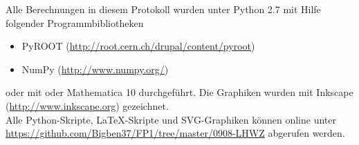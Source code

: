 \documentclass[12pt, a4paper]{scrartcl}
\title{\exptitle}
\subtitle{Fortgeschrittenen-Praktikum 1}
\author{Moritz Bitterling und Benjamin Rottler \\ Universität Freiburg}
\date{\expdate}
\numberwithin{equation}{section} %
\numberwithin{table}{section}    %
\begin{document}
\hypersetup{pageanchor=false} %

\thispagestyle{empty}

\newpage
Alle Berechnungen in diesem Protokoll wurden unter Python 2.7 mit Hilfe folgender Programmbibliotheken
\begin{itemize}
  \item PyROOT (\url{http://root.cern.ch/drupal/content/pyroot})
  \item NumPy (\url{http://www.numpy.org/})
\end{itemize}
oder mit oder Mathematica 10 durchgeführt.
Die Graphiken wurden mit Inkscape (\url{http://www.inkscape.org}) gezeichnet.\\[\baselineskip]
Alle Python-Skripte, \LaTeX-Skripte und SVG-Graphiken können online unter \\
\url{https://github.com/Bigben37/FP1/tree/master/0908-LHWZ} abgerufen werden.
\thispagestyle{empty}

\newpage
\tableofcontents
\thispagestyle{empty}

\newpage
\hypersetup{pageanchor=true} %
\setcounter{page}{1} %

 





%
\end{document}
